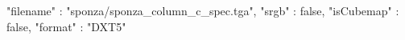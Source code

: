 { 
	"filename" : "sponza/sponza_column_c_spec.tga", 
	"srgb" : false,
	"isCubemap" : false,
	"format" : "DXT5"
}